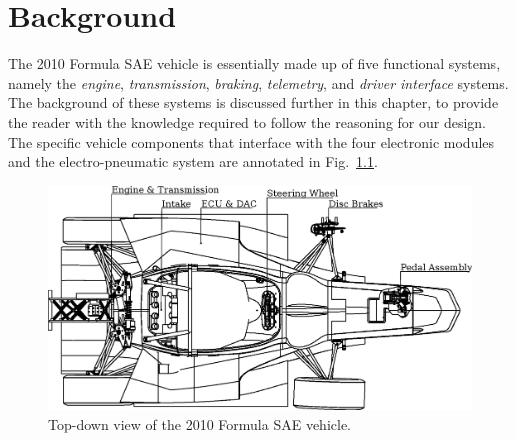 \chapter{Background\label{cha:background}}

The 2010 Formula SAE vehicle is essentially made up of five functional systems, namely the \emph{engine}, \emph{transmission}, \emph{braking}, \emph{telemetry}, and \emph{driver interface} systems. The background of these systems is discussed further in this chapter, to provide the reader with the knowledge required to follow the reasoning for our design. The specific vehicle components that interface with the four electronic modules and the electro-pneumatic system are annotated in Fig.\ \ref{fig:background_overview_topdown}. 

\vspace{1em}
\begin{figure}[H]
\centering
\includegraphics[width=6in,keepaspectratio]{background/figures/background_diagram.eps}
\caption{Top-down view of the 2010 Formula SAE vehicle.}
\label{fig:background_overview_topdown}
\end{figure}






